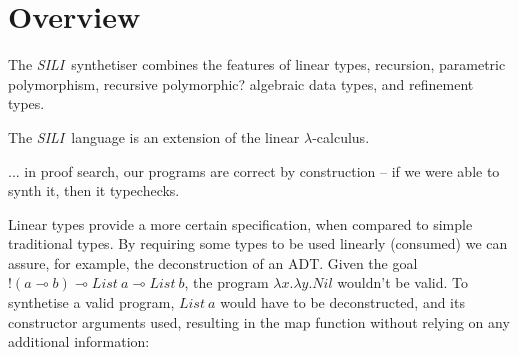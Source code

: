 \documentclass{llncs}
\newcommand{\lolli}{\multimap}
\newcommand{\bang}{{!}}
\newcommand{\mypara}[1]{\paragraph{\textbf{#1}.}}
\newcommand{\synname}{\emph{SILI}}
\begin{document}













\section{Overview}\label{sec:overview}

The \synname\ synthetiser combines the features of linear types, recursion,
parametric polymorphism, recursive polymorphic? algebraic data types, and
refinement types.

The \synname\ language is an extension of the linear $\lambda$-calculus.

... in proof search, our programs are correct by construction -- if
we were able to synth it, then it typechecks.

Linear types provide a more certain specification, when compared to simple
traditional types. By requiring some types to be used linearly (consumed) we can
assure, for example, the deconstruction of an ADT. Given the goal $\bang(a \lolli b)
\lolli List\ a \lolli List\ b$, the program $\lambda x. \lambda y. Nil$ wouldn't
be valid. To synthetise a valid program, $List\ a$
would have to be deconstructed, and its constructor arguments used, resulting
in the map function without relying on any additional information:
\end{document}
